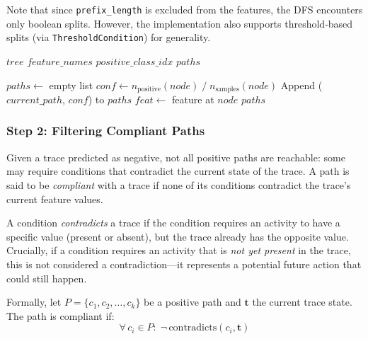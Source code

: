 \documentclass{article}
\begin{document}
\medskip
\noindent
Note that since \texttt{prefix\_length} is excluded from the features, the DFS encounters only boolean splits. However, the implementation also supports threshold-based splits (via \texttt{ThresholdCondition}) for generality.

\begin{algorithm}[H]
\caption{Extract Positive Paths (DFS)}
\label{alg:positive-paths}
\begin{algorithmic}[1]
\Require $tree$ 
\Require $feature\_names$ 
\Require $positive\_class\_idx$ 
\Ensure $paths$ 

\State $paths \gets$ empty list
            \State $conf \gets n_{\text{positive}}(node) \;/\; n_{\text{samples}}(node)$
            \State Append ($current\_path$, $conf$) to $paths$
        \EndIf
        \State \Return
    \EndIf
    \State $feat \gets$ feature at $node$
    \State {}
    \State {}
\EndFunction
\State {}
\State \Return $paths$
\end{algorithmic}
\end{algorithm}

\subsubsection{Step 2: Filtering Compliant Paths}

Given a trace predicted as negative, not all positive paths are reachable: some may require conditions that contradict the current state of the trace. A path is said to be \textit{compliant} with a trace if none of its conditions contradict the trace's current feature values.

\medskip
\noindent
A condition \textit{contradicts} a trace if the condition requires an activity to have a specific value (present or absent), but the trace already has the opposite value. Crucially, if a condition requires an activity that is \textit{not yet present} in the trace, this is not considered a contradiction---it represents a potential future action that could still happen.

\medskip
\noindent
Formally, let $P = \{c_1, c_2, \dots, c_k\}$ be a positive path and $\mathbf{t}$ the current trace state. The path is compliant if:
\[
\forall \, c_i \in P: \; \neg \, \text{contradicts}(c_i, \mathbf{t})
\]
\end{document}
